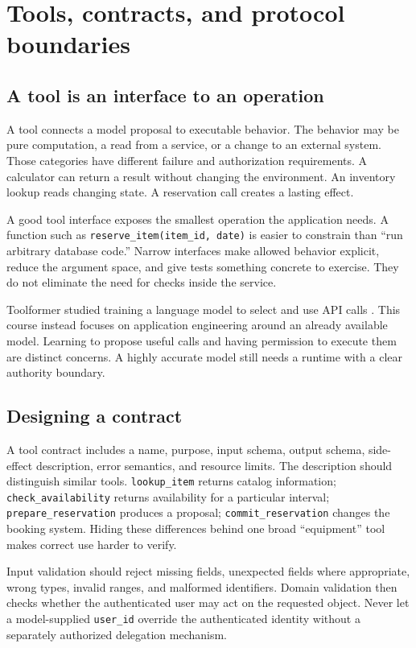 \chapter{Tools, contracts, and protocol boundaries}
\section{A tool is an interface to an operation}
A tool connects a model proposal to executable behavior. The behavior may be pure computation, a read from a service, or a change to an external system. Those categories have different failure and authorization requirements. A calculator can return a result without changing the environment. An inventory lookup reads changing state. A reservation call creates a lasting effect.

A good tool interface exposes the smallest operation the application needs. A function such as \texttt{reserve\_item(item\_id, date)} is easier to constrain than “run arbitrary database code.” Narrow interfaces make allowed behavior explicit, reduce the argument space, and give tests something concrete to exercise. They do not eliminate the need for checks inside the service.

Toolformer studied training a language model to select and use API calls \cite{toolformer}. This course instead focuses on application engineering around an already available model. Learning to propose useful calls and having permission to execute them are distinct concerns. A highly accurate model still needs a runtime with a clear authority boundary.

\section{Designing a contract}
A tool contract includes a name, purpose, input schema, output schema, side-effect description, error semantics, and resource limits. The description should distinguish similar tools. \texttt{lookup\_item} returns catalog information; \texttt{check\_availability} returns availability for a particular interval; \texttt{prepare\_reservation} produces a proposal; \texttt{commit\_reservation} changes the booking system. Hiding these differences behind one broad “equipment” tool makes correct use harder to verify.

Input validation should reject missing fields, unexpected fields where appropriate, wrong types, invalid ranges, and malformed identifiers. Domain validation then checks whether the authenticated user may act on the requested object. Never let a model-supplied \texttt{user\_id} override the authenticated identity without a separately authorized delegation mechanism.

